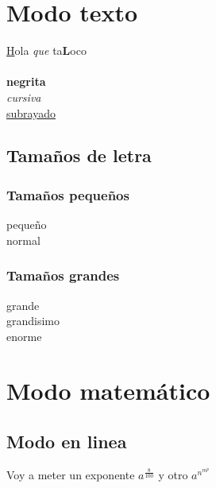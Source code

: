 \documentclass[10pt,a4paper]{report}
\begin{document}
\pagebreak
\tableofcontents
\pagebreak

\chapter{Modo texto}

{\underline Hola} {\it que} ta{\bf L}oco \\
\\
{\bf negrita} \\
{\it cursiva} \\
\underline{subrayado}

\section{Tamaños de letra}

\subsection{Tamaños pequeños}

{\tiny pequeño} \\
{\normalsize normal} \\

\subsection{Tamaños grandes}

{\large grande} \\
{\LARGE grandisimo} \\
{\huge enorme} \\

\chapter{Modo matemático}

\section{Modo en linea}

Voy a meter un exponente $ a^{\frac{8}{100}} $ y otro $ a^{n^{m^p}} $
\end{document}
